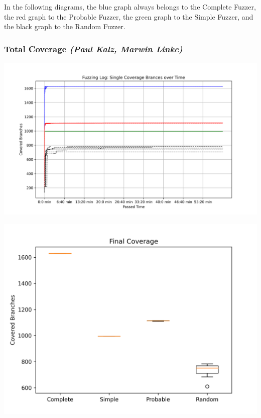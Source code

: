 \documentclass[runningheads]{llncs}
\begin{document}
In the following diagrams, the blue graph always belongs to the Complete Fuzzer, the red graph to the Probable Fuzzer, the green graph to the Simple Fuzzer, and the black graph to the Random Fuzzer.
\subsubsection{Total Coverage \normalfont\textit{(Paul Kalz, Marwin Linke)}}
\begin{center}
\includegraphics[width=\textwidth]{img/complete_coverage}
\label{fig1}
\end{center}
\begin{center}
\includegraphics[width=\textwidth]{img/boxplot_coverage}
\label{fig2}
\end{center}
\end{document}
